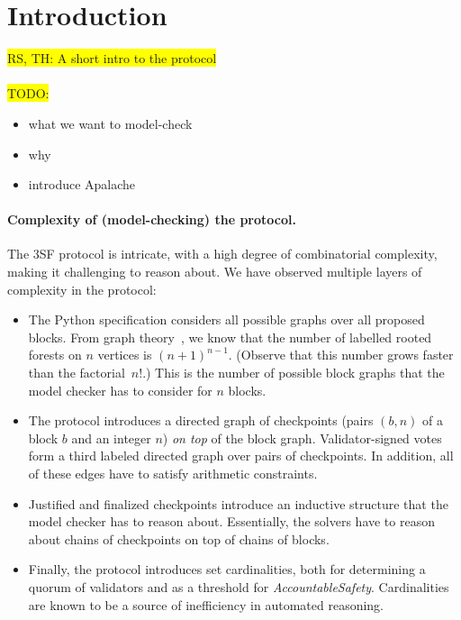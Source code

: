 
\section{Introduction}

\colorbox{yellow}{RS, TH: A short intro to the protocol}

\paragraph{}\colorbox{yellow}{TODO:}

\begin{itemize}
  \item what we want to model-check
  \item why \tlap{}
  \item introduce Apalache
\end{itemize}

\paragraph{Complexity of (model-checking) the protocol.} The 3SF protocol is
intricate, with a high degree of combinatorial complexity, making it challenging
to reason about. We have observed multiple layers of complexity in the protocol:
\begin{itemize}
  \item The Python specification considers all possible graphs over all proposed
    blocks. From graph theory~\cite{cayley1878theorem}, we know that the number
    of labelled rooted forests on $n$ vertices is ${(n+1)}^{n-1}$. (Observe that
    this number grows faster than the factorial~$n!$.) This is the number of
    possible block graphs that the model checker has to consider for $n$ blocks.
  \item The protocol introduces a directed graph of checkpoints (pairs $(b,n)$
    of a block $b$ and an integer $n$) \emph{on top} of the block graph.
    Validator-signed votes form a third labeled directed graph over pairs of
    checkpoints. In addition, all of these edges have to satisfy arithmetic
    constraints.
  \item Justified and finalized checkpoints introduce an inductive structure
    that the model checker has to reason about. Essentially, the solvers have to
    reason about chains of checkpoints on top of chains of blocks.
  \item Finally, the protocol introduces set cardinalities, both for determining a
    quorum of validators and as a threshold for \textit{AccountableSafety}.
    Cardinalities are known to be a source of inefficiency in automated
    reasoning.
\end{itemize}

